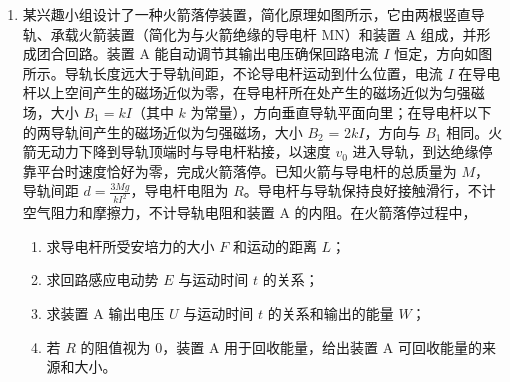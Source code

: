 \documentclass[\gkver]{gaokaozhenti}
\begin{document}
\begin{enumerate}
\item
某兴趣小组设计了一种火箭落停装置，简化原理如图所示，它由两根竖直导轨、承载火箭装置（简化为与火箭绝缘的导电杆 MN）和装置 A 组成，并形成团合回路。装置 A 能自动调节其输出电压确保回路电流 $I$ 恒定，方向如图所示。导轨长度远大于导轨间距，不论导电杆运动到什么位置，电流 $I$ 在导电杆以上空间产生的磁场近似为零，在导电杆所在处产生的磁场近似为匀强磁场，大小 $B_{1} = kI$（其中 $k$ 为常量），方向垂直导轨平面向里；在导电杆以下的两导轨间产生的磁场近似为匀强磁场，大小 $B_{2}$ = 2$kI$，方向与 $B_{1}$ 相同。火箭无动力下降到导轨顶端时与导电杆粘接，以速度 $v_{0}$ 进入导轨，到达绝缘停靠平台时速度恰好为零，完成火箭落停。已知火箭与导电杆的总质量为 $M$，导轨间距 $d = \frac{{3Mg}}{{k{I^2}}}$，导电杆电阻为 $R$。导电杆与导轨保持良好接触滑行，不计空气阻力和摩擦力，不计导轨电阻和装置 A 的内阻。在火箭落停过程中，
\begin{enumerate}
	\item
	求导电杆所受安培力的大小 $F$ 和运动的距离 $L$；
	\item
	求回路感应电动势 $E$ 与运动时间 $t$ 的关系；
	\item
	求装置 A 输出电压 $U$ 与运动时间 $t$ 的关系和输出的能量 $W$；
	\item
	若 $R$ 的阻值视为 0，装置 A 用于回收能量，给出装置 A 可回收能量的来源和大小。
\end{enumerate}
\end{enumerate}
\end{document}
